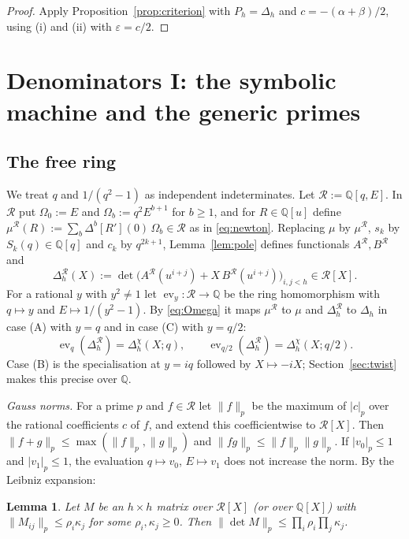 \documentclass[11pt]{amsart}
\newtheorem{lemma}[theorem]{Lemma}
\theoremstyle{definition}
\theoremstyle{remark}
\numberwithin{equation}{section}
\newcommand{\QQ}{\mathbb{Q}}
\newcommand{\cR}{\mathcal{R}}
\newcommand{\eps}{\varepsilon}
\newcommand{\ev}{\operatorname{ev}}
\begin{document}
\begin{proof}
Apply Proposition~\ref{prop:criterion} with $P_h=\Delta_h$ and $c=-(\alpha+\beta)/2$, using (i) and (ii) with
$\eps=c/2$.
\end{proof}

\section{Denominators I: the symbolic machine and the generic primes}\label{sec:arith1}

\subsection{The free ring}\label{sec:free}
We treat $q$ and $1/(q^2-1)$ as independent indeterminates. Let $\cR:=\QQ[q,E]$. In $\cR$ put $\Omega_0:=E$ and
$\Omega_b:=q^2E^{b+1}$ for $b\ge1$, and for $R\in\QQ[u]$ define $\mu^{\cR}(R):=\sum_b\Delta^b[R'](0)\,\Omega_b\in\cR$ as
in \eqref{eq:newton}. Replacing $\mu$ by $\mu^{\cR}$, $s_k$ by $S_k(q)\in\QQ[q]$ and $c_k$ by $q^{2k+1}$,
Lemma~\ref{lem:pole} defines functionals $A^{\cR},B^{\cR}$ and
\[
  \Delta^{\cR}_h(X):=\det\bigl(A^{\cR}(u^{i+j})+X\,B^{\cR}(u^{i+j})\bigr)_{i,j<h}\in\cR[X].
\]
For a rational $y$ with $y^2\ne1$ let $\ev_y\colon\cR\to\QQ$ be the ring homomorphism with $q\mapsto y$ and
$E\mapsto1/(y^2-1)$. By \eqref{eq:Omega} it maps $\mu^{\cR}$ to $\mu$ and $\Delta^{\cR}_h$ to $\Delta_h$ in case (A)
with $y=q$ and in case (C) with $y=q/2$:
\begin{equation}\label{eq:spec}
  \ev_q(\Delta^{\cR}_h)=\Delta^\chi_h(X;q),\qquad \ev_{q/2}(\Delta^{\cR}_h)=\Delta^\chi_h(X;q/2).
\end{equation}
Case (B) is the specialisation at $y=iq$ followed by $X\mapsto-iX$; Section~\ref{sec:twist} makes this precise over $\QQ$.

\emph{Gauss norms.} For a prime $p$ and $f\in\cR$ let $\|f\|_p$ be the maximum of $|c|_p$ over the rational
coefficients $c$ of $f$, and extend this coefficientwise to $\cR[X]$. Then $\|f+g\|_p\le\max(\|f\|_p,\|g\|_p)$ and
$\|fg\|_p\le\|f\|_p\|g\|_p$. If $|v_0|_p\le1$ and $|v_1|_p\le1$, the evaluation $q\mapsto v_0$, $E\mapsto v_1$
does not increase the norm. By the Leibniz expansion:

\begin{lemma}\label{lem:leibniz}
Let $M$ be an $h\times h$ matrix over $\cR[X]$ (or over $\QQ[X]$) with $\|M_{ij}\|_p\le\rho_i\kappa_j$ for some
$\rho_i,\kappa_j\ge0$. Then $\|\det M\|_p\le\prod_i\rho_i\prod_j\kappa_j$.
\end{lemma}
\end{document}

